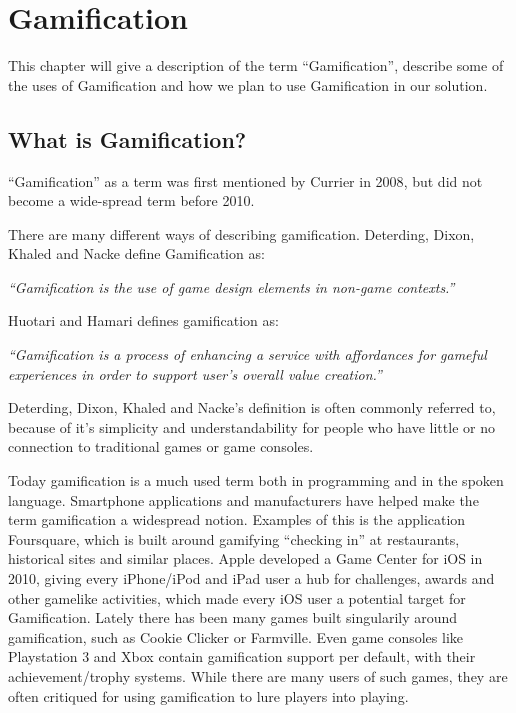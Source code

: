 \chapter{Gamification}
\label{chp:gamification}

This chapter will give a description of the term ``Gamification'', describe some of the uses of Gamification and how we plan to use Gamification in our solution.

\section{What is Gamification?}
\label{sec:whatisgamification}
``Gamification'' as a term was first mentioned by Currier in 2008\cite{gamificationcurrier}, but did not become a wide-spread term before 2010. 

There are many different ways of describing gamification. Deterding, Dixon, Khaled and Nacke\cite{Deterding:2011:GDE:2181037.2181040} define Gamification as:

\textit{``Gamification is the use of game design elements in non-game
contexts.''}

Huotari and Hamari\cite{huotari2012defining} defines gamification as:

\textit{``Gamification is a process of enhancing a service with affordances for gameful experiences in order to support user's overall value creation.''}

Deterding, Dixon, Khaled and Nacke's definition is often commonly referred to, because of it's simplicity and understandability for people who have little or no connection to traditional games or game consoles.

Today gamification is a much used term both in programming and in the spoken language. Smartphone applications and manufacturers have helped make the term gamification a widespread notion. Examples of this is the application Foursquare, which is built around gamifying ``checking in'' at restaurants, historical sites and similar places. Apple developed a Game Center for iOS in 2010, giving every iPhone/iPod and iPad user a hub for challenges, awards and other gamelike activities, which made every iOS user a potential target for Gamification. Lately there has been many games built singularily around gamification, such as Cookie Clicker or Farmville. Even game consoles like Playstation 3 and Xbox contain gamification support per default, with their achievement/trophy systems. While there are many users of such games, they are often critiqued for using gamification to lure players into playing. 


